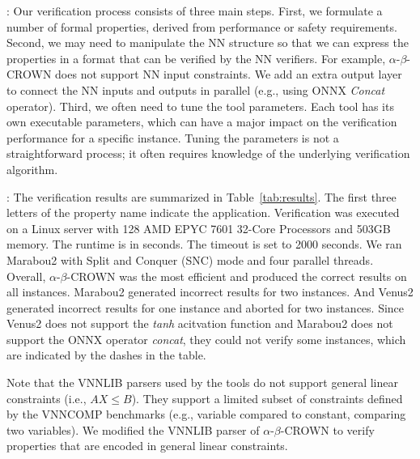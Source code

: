 : Our verification process consists of three main steps. First, we formulate a number of formal properties, derived from performance or safety requirements. Second, we may need to manipulate the NN structure so that we can express the properties in a format that can be verified by the NN verifiers. For example, $\alpha$-$\beta$-CROWN does not support NN input constraints. We add an extra output layer to connect the NN inputs and outputs in parallel (e.g., using ONNX \emph{Concat} operator). Third, we often need to tune the tool parameters. Each tool has its own executable parameters, which can have a major impact on the verification performance for a specific instance. Tuning the parameters is not a straightforward process; it often requires knowledge of the underlying verification algorithm. 


: The verification results are summarized in Table~\ref{tab:results}. The first three letters of the property name indicate the application. Verification was executed on a Linux server with 128 AMD EPYC 7601 32-Core Processors and 503GB memory. The runtime is in seconds. The timeout is set to 2000 seconds. We ran Marabou2 with Split and Conquer (SNC) mode and four parallel threads. Overall, $\alpha$-$\beta$-CROWN was the most efficient and produced the correct results on all instances. Marabou2 generated incorrect results for two instances. And Venus2 generated incorrect results for one instance and aborted for two instances. Since Venus2 does not support the \emph{tanh} acitvation function and Marabou2 does not support the ONNX operator \emph{concat}, they could not verify some instances, which are indicated by the dashes in the table.

Note that the VNNLIB parsers used by the tools do not support general linear constraints (i.e., $AX\le B$). They support a limited subset of constraints defined by the VNNCOMP benchmarks (e.g., variable compared to constant, comparing two variables). We modified the VNNLIB parser of $\alpha$-$\beta$-CROWN to verify properties that are encoded in general linear constraints. 



